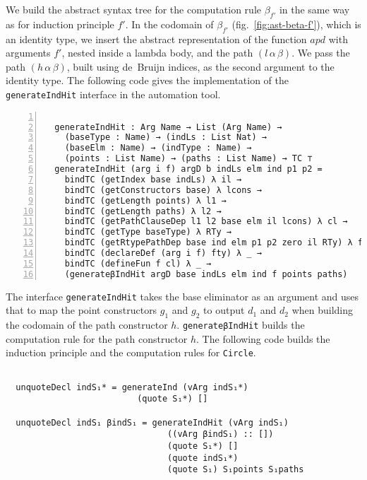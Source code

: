 \documentclass[sigplan,10pt]{acmart}
\begin{document}
We build the abstract syntax tree for the computation rule $\beta_{f'}$ in the same way as for induction principle $f'$. In the codomain of $\beta_{f'}$ (fig.~\ref{fig:ast-beta-f'}), which is an identity type, we insert the abstract representation of the function $apd$ with arguments $f'$, nested inside a lambda body, and the path $(l \, \alpha \, \beta)$. We pass the path $(h \, \alpha \, \beta)$, built using de~Bruijn indices, as the second argument to the identity type. The following code gives the implementation of the {\tt generateIndHit} interface in the automation tool.

\begin{center}
\begingroup
\fontsize{7pt}{9pt}\selectfont
\begin{Verbatim}[frame = lines, rulecolor=\color{blue}, numbers = left, numbersep = 0pt]

  generateIndHit : Arg Name → List (Arg Name) → 
    (baseType : Name) → (indLs : List Nat) → 
    (baseElm : Name) → (indType : Name) → 
    (points : List Name) → (paths : List Name) → TC ⊤
  generateIndHit (arg i f) argD b indLs elm ind p1 p2 =
    bindTC (getIndex base indLs) λ il →
    bindTC (getConstructors base) λ lcons → 
    bindTC (getLength points) λ l1 →
    bindTC (getLength paths) λ l2 →
    bindTC (getPathClauseDep l1 l2 base elm il lcons) λ cl →
    bindTC (getType baseType) λ RTy →
    bindTC (getRtypePathDep base ind elm p1 p2 zero il RTy) λ fty →
    bindTC (declareDef (arg i f) fty) λ _ →
    bindTC (defineFun f cl) λ _ →
    (generateβIndHit argD base indLs elm ind f points paths)

\end{Verbatim}
\endgroup
\end{center}

The interface {\tt generateIndHit} takes the base eliminator as an argument and uses that to map the point constructors $g_1$ and $g_2$ to output $d_1$ and $d_2$ when building the codomain of the path constructor $h$. {\tt generateβIndHit} builds the computation rule for the path constructor $h$. The following code builds the induction principle and the computation rules for {\tt Circle}.

\begin{center}
\begingroup
\fontsize{8pt}{9pt}\selectfont
\begin{Verbatim}

  unquoteDecl indS₁* = generateInd (vArg indS₁*)
                          (quote S₁*) []

  unquoteDecl indS₁ βindS₁ = generateIndHit (vArg indS₁) 
                                ((vArg βindS₁) :: [])
                                (quote S₁*) []
                                (quote indS₁*)
                                (quote S₁) S₁points S₁paths

\end{Verbatim}
\endgroup
\end{center}
\end{document}

